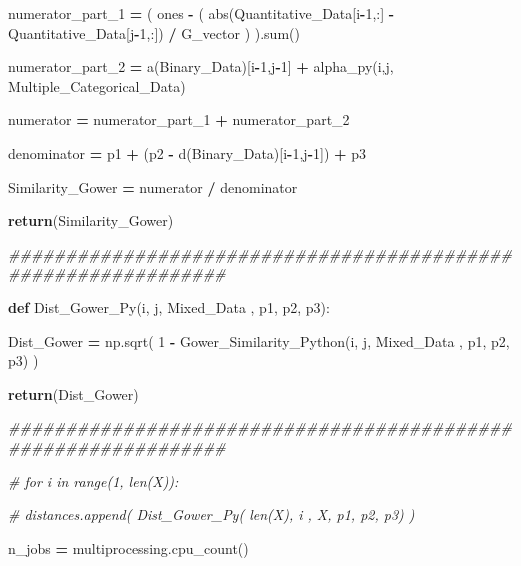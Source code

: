 \documentclass[
  11pt,
  a4paper,
]{article}
\newenvironment{Shaded}{\begin{snugshade}}{\end{snugshade}}
\newcommand{\BuiltInTok}[1]{#1}
\newcommand{\CommentTok}[1]{\textcolor[rgb]{0.56,0.35,0.01}{\textit{#1}}}
\newcommand{\ControlFlowTok}[1]{\textcolor[rgb]{0.13,0.29,0.53}{\textbf{#1}}}
\newcommand{\DecValTok}[1]{\textcolor[rgb]{0.00,0.00,0.81}{#1}}
\newcommand{\KeywordTok}[1]{\textcolor[rgb]{0.13,0.29,0.53}{\textbf{#1}}}
\newcommand{\NormalTok}[1]{#1}
\newcommand{\OperatorTok}[1]{\textcolor[rgb]{0.81,0.36,0.00}{\textbf{#1}}}
\begin{document}
\begin{Shaded}
\begin{Highlighting}[]
\NormalTok{            numerator\_part\_1 }\OperatorTok{=}\NormalTok{ ( ones }\OperatorTok{{-}}\NormalTok{ ( }\BuiltInTok{abs}\NormalTok{(Quantitative\_Data[i}\OperatorTok{{-}}\DecValTok{1}\NormalTok{,:] }\OperatorTok{{-}}\NormalTok{ Quantitative\_Data[j}\OperatorTok{{-}}\DecValTok{1}\NormalTok{,:]) }\OperatorTok{/}\NormalTok{ G\_vector ) ).}\BuiltInTok{sum}\NormalTok{() }

\NormalTok{            numerator\_part\_2 }\OperatorTok{=}\NormalTok{ a(Binary\_Data)[i}\OperatorTok{{-}}\DecValTok{1}\NormalTok{,j}\OperatorTok{{-}}\DecValTok{1}\NormalTok{] }\OperatorTok{+}\NormalTok{ alpha\_py(i,j, Multiple\_Categorical\_Data)}

\NormalTok{            numerator }\OperatorTok{=}\NormalTok{ numerator\_part\_1 }\OperatorTok{+}\NormalTok{ numerator\_part\_2}
 
\NormalTok{            denominator }\OperatorTok{=}\NormalTok{ p1 }\OperatorTok{+}\NormalTok{ (p2 }\OperatorTok{{-}}\NormalTok{ d(Binary\_Data)[i}\OperatorTok{{-}}\DecValTok{1}\NormalTok{,j}\OperatorTok{{-}}\DecValTok{1}\NormalTok{]) }\OperatorTok{+}\NormalTok{ p3}

\NormalTok{            Similarity\_Gower }\OperatorTok{=}\NormalTok{ numerator }\OperatorTok{/}\NormalTok{ denominator  }

            \ControlFlowTok{return}\NormalTok{(Similarity\_Gower)}

\CommentTok{\#\#\#\#\#\#\#\#\#\#\#\#\#\#\#\#\#\#\#\#\#\#\#\#\#\#\#\#\#\#\#\#\#\#\#\#\#\#\#\#\#\#\#\#\#\#\#\#\#\#\#\#\#\#\#\#\#\#\#\#\#\#\#}

        \KeywordTok{def}\NormalTok{ Dist\_Gower\_Py(i, j, Mixed\_Data , p1, p2, p3):}

\NormalTok{            Dist\_Gower }\OperatorTok{=}\NormalTok{ np.sqrt( }\DecValTok{1} \OperatorTok{{-}}\NormalTok{ Gower\_Similarity\_Python(i, j, Mixed\_Data , p1, p2, p3) )}

            \ControlFlowTok{return}\NormalTok{(Dist\_Gower)    }

\CommentTok{\#\#\#\#\#\#\#\#\#\#\#\#\#\#\#\#\#\#\#\#\#\#\#\#\#\#\#\#\#\#\#\#\#\#\#\#\#\#\#\#\#\#\#\#\#\#\#\#\#\#\#\#\#\#\#\#\#\#\#\#\#\#\#}

        \CommentTok{\# for i in range(1, len(X)):}

            \CommentTok{\# distances.append( Dist\_Gower\_Py( len(X), i , X, p1, p2, p3) )}

\NormalTok{        n\_jobs  }\OperatorTok{=}\NormalTok{ multiprocessing.cpu\_count()}


\end{Highlighting}
\end{Shaded}
\end{document}
